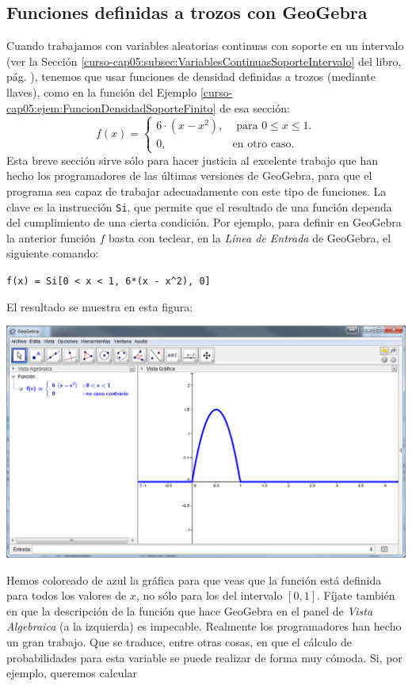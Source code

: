 \documentclass[10pt,a4paper]{article}\usepackage[]{graphicx}\usepackage[]{color}
\newcounter{cont01}
\begin{document}
\subsection{Funciones definidas a trozos con GeoGebra}
\label{tut05:subsec:FuncionesDefinidasTrozosGeoGebra}

Cuando trabajamos con variables aleatorias continuas con soporte en un intervalo (ver la Sección \ref{curso-cap05:subsec:VariablesContinuasSoporteIntervalo} del libro, pág. \pageref{curso-cap05:subsec:VariablesContinuasSoporteIntervalo}), tenemos que usar funciones de densidad definidas a trozos (mediante llaves), como en la función del Ejemplo \ref{curso-cap05:ejem:FuncionDensidadSoporteFinito} de esa sección:
 \[f(x)=\begin{cases}6\cdot(x-x^2),&\mbox{ para }0\leq x\leq 1.\\ 0,&\mbox{en otro caso}.\end{cases}\]
Esta breve sección sirve sólo para hacer justicia al excelente trabajo que han hecho los programadores de las últimas versiones de GeoGebra, para que el programa sea capaz de trabajar adecuadamente con este tipo de funciones. La clave es la instrucción {\tt Si}, que permite que el resultado de una función dependa del cumplimiento de una cierta condición. Por ejemplo, para definir en GeoGebra la anterior función $f$ basta con teclear, en la {\em Línea de Entrada} de GeoGebra, el siguiente comando:
\begin{center}
    \verb#f(x) = Si[0 < x < 1, 6*(x - x^2), 0]#
\end{center}
El resultado se muestra en esta figura:
    \begin{center}
        \includegraphics[width=14cm]{../fig/Tut05-57.png}
    \end{center}
Hemos coloreado de azul la gráfica para que veas que la función está definida para todos los valores de $x$, no sólo para los del intervalo $[0,1]$. Fíjate también en que la descripción de la función que hace GeoGebra en el panel de {\em Vista Algebraica} (a la izquierda) es impecable. Realmente los programadores han hecho un gran trabajo. Que se traduce, entre otras cosas, en que el cálculo de probabilidades para esta variable se puede realizar de forma muy cómoda. Si, por ejemplo, queremos calcular
\end{document}
